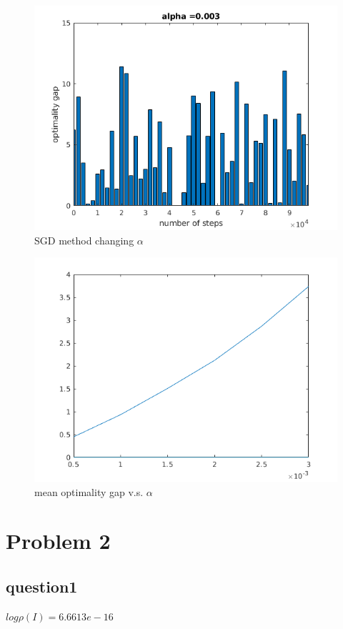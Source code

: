\documentclass[a4paper, 11pt]{article}
\begin{document}
\begin{figure}[htbp]
\centering
\includegraphics[scale=0.7]{figure/p1_2_6.png}
\caption{SGD method changing $\alpha$}
\label{p1_2_6}
\end{figure}

\begin{figure}[htbp]
\centering
\includegraphics[scale=0.7]{figure/p1_2_7.png}
\caption{mean optimality gap v.s. $\alpha$ }
\label{p1_2_7}
\end{figure}

\newpage
\section*{Problem 2}
\subsection*{question1}
$log \rho(I) = 6.6613e-16$
\end{document}
